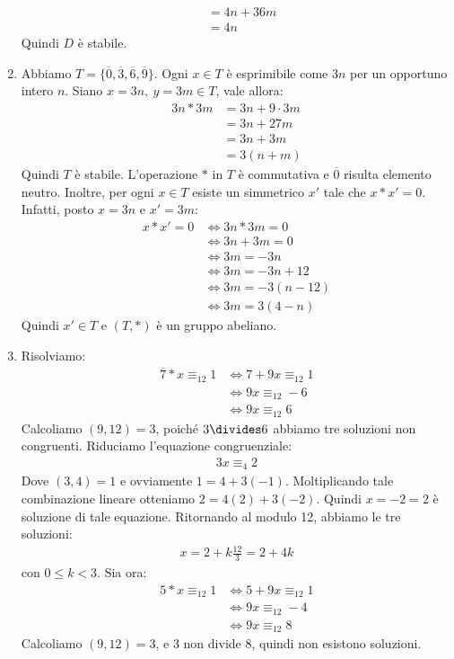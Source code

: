 \begin{enumerate}[label=(\textit{\roman*})]
\begin{align*}
	&= 4n + 36m \\
	&= 4n 
\end{align*}
Quindi $D$ è stabile.
\item Abbiamo $T=\{\overline{0},\overline{3},\overline{6},\overline{9}\}$. Ogni $x \in T$ è esprimibile come $3n$ per un opportuno intero $n$. Siano $x =3n,\ y=3m \in T$, vale allora:
\begin{align*}
	3n \ast 3m &= 3n + 9 \cdot 3m \\
	&= 3n + 27m \\
	&= 3n + 3m \\
	&= 3(n+m)
\end{align*}
Quindi $T$ è stabile. L'operazione $\ast$ in $T$ è commutativa e $\overline{0}$ risulta elemento neutro. Inoltre, per ogni $x \in T$ esiste un simmetrico $x'$ tale che $x \ast x' = 0$. Infatti, posto $x =3n$ e $x'=3m$:
\begin{align*}
	x \ast x' = 0 &\iff 3n \ast 3m = 0 \\
	&\iff 3n + 3m = 0 \\
	&\iff 3m = -3n \\
	&\iff 3m = -3n+12 \\
	&\iff 3m = -3(n-12) \\
	&\iff 3m = 3(4-n)
\end{align*}
Quindi $x'\in T$ e $(T,\ast)$ è un gruppo abeliano.
\item Risolviamo:
\begin{align*}
	\overline{7} \ast x \equiv_{12} 1 &\iff 7 + 9x \equiv_{12} 1 \\
	&\iff 9x \equiv_{12} -6 \\
	&\iff 9x \equiv_{12} 6
\end{align*}
Calcoliamo $(9,12)=3$, poiché $3 \divides 6$ abbiamo tre soluzioni non congruenti. Riduciamo l'equazione congruenziale:
\begin{align*}
	3x \equiv_{4} 2 
\end{align*}
Dove $(3,4)=1$ e ovviamente $1=4 + 3(-1)$. Moltiplicando tale combinazione lineare otteniamo $2 = 4(2) + 3(-2)$. Quindi $x=-2 = 2$ è soluzione di tale equazione. Ritornando al modulo 12, abbiamo le tre soluzioni:
\begin{align*}
	x = 2 + k\frac{12}{3} = 2 + 4k
\end{align*}
con $0 \leq k < 3$. Sia ora:
\begin{align*}
	5 \ast x \equiv_{12} 1 &\iff 5+9x \equiv_{12} 1 \\
	&\iff 9x \equiv_{12} -4 \\
	&\iff 9x \equiv_{12} 8
\end{align*}
Calcoliamo $(9,12)=3$, e 3 non divide 8, quindi non esistono soluzioni.
\end{enumerate}
